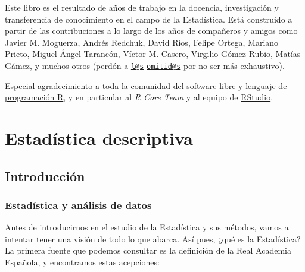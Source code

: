 \documentclass[
]{book}
\begin{document}
Este libro es el resultado de años de trabajo en la docencia, investigación
y transferencia de conocimiento en el campo de la Estadística. Está construido
a partir de las contribuciones a lo largo de los años de compañeros y amigos
como Javier M. Moguerza, Andrés Redchuk, David Ríos, Felipe Ortega, Mariano Prieto,
Miguel Ángel Tarancón, Víctor M. Casero, Virgilio Gómez-Rubio, Matías Gámez, y
muchos otros (perdón
a \href{mailto:l@s}{\nolinkurl{l@s}} \href{mailto:omitid@s}{\nolinkurl{omitid@s}} por no ser más exhaustivo).

Especial agradecimiento a toda la comunidad del \href{https://www.r-project.org}{software libre y
lenguaje de programación R}, y en particular al \emph{R Core Team} y al equipo
de \href{https://www.rstudio.com}{RStudio}.

\hypertarget{part-estaduxedstica-descriptiva}{%
\part{Estadística descriptiva}\label{part-estaduxedstica-descriptiva}}

\hypertarget{intro}{%
\chapter{Introducción}\label{intro}}

\hypertarget{estaduxedstica-y-anuxe1lisis-de-datos}{%
\section{Estadística y análisis de datos}\label{estaduxedstica-y-anuxe1lisis-de-datos}}

Antes de introducirnos en el estudio de la Estadística y sus métodos, vamos a
intentar tener una visión de todo lo que abarca. Así pues, ¿qué es la Estadística?
La primera fuente que podemos consultar es la definición de la Real Academia Española,
y encontramos estas acepciones:
\end{document}
